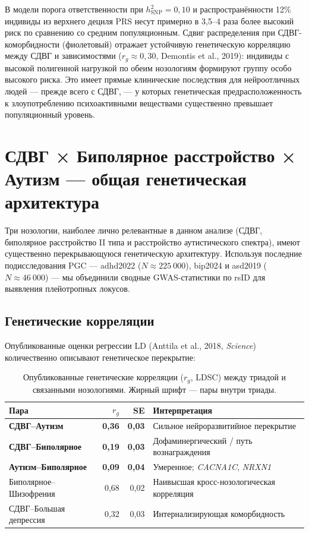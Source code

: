 \documentclass[11pt, a4paper]{article}
\begin{document}
В модели порога ответственности при $h^2_\text{SNP} = 0{,}10$ и
распространённости 12\% индивиды из верхнего дециля PRS несут примерно
в 3,5--4 раза более высокий риск по сравнению со средним популяционным. Сдвиг
распределения при СДВГ-коморбидности (фиолетовый) отражает устойчивую
генетическую корреляцию между СДВГ и зависимостями ($r_g \approx 0{,}30$,
Demontis et al., 2019): индивиды с высокой полигенной нагрузкой по обеим
нозологиям формируют группу особо высокого риска. Это имеет прямые клинические
последствия для нейроотличных людей — прежде всего с СДВГ, — у которых
генетическая предрасположенность к злоупотреблению психоактивными веществами
существенно превышает популяционный уровень.

\section{СДВГ × Биполярное расстройство × Аутизм — общая генетическая архитектура}

Три нозологии, наиболее лично релевантные в данном анализе (СДВГ, биполярное
расстройство II типа и расстройство аутистического спектра), имеют существенно
перекрывающуюся генетическую архитектуру. Используя последние подисследования PGC
— adhd2022 ($N\approx225~000$), bip2024 и asd2019 ($N\approx46~000$) — мы
объединили сводные GWAS-статистики по rsID для выявления плейотропных локусов.

\subsection{Генетические корреляции}

Опубликованные оценки регрессии LD (Anttila et al., 2018, \textit{Science})
количественно описывают генетическое перекрытие:

\begin{table}[H]
\centering
\caption{Опубликованные генетические корреляции ($r_g$, LDSC) между триадой
         и связанными нозологиями. Жирный шрифт — пары внутри триады.}
\label{tab:rg}
\begin{tabular}{lrrl}
\toprule
Пара & $r_g$ & SE & Интерпретация \\
\midrule
\textbf{СДВГ–Аутизм}          & \textbf{0{,}36} & \textbf{0{,}03} & Сильное нейроразвитийное перекрытие \\
\textbf{СДВГ–Биполярное}      & \textbf{0{,}19} & \textbf{0{,}03} & Дофаминергический / путь вознаграждения \\
\textbf{Аутизм–Биполярное}    & \textbf{0{,}09} & \textbf{0{,}04} & Умеренное; \textit{CACNA1C}, \textit{NRXN1} \\
Биполярное–Шизофрения         & 0{,}68 & 0{,}02 & Наивысшая кросс-нозологическая корреляция \\
СДВГ–Большая депрессия        & 0{,}32 & 0{,}03 & Интернализирующая коморбидность \\
\bottomrule
\end{tabular}
\end{table}
\end{document}

